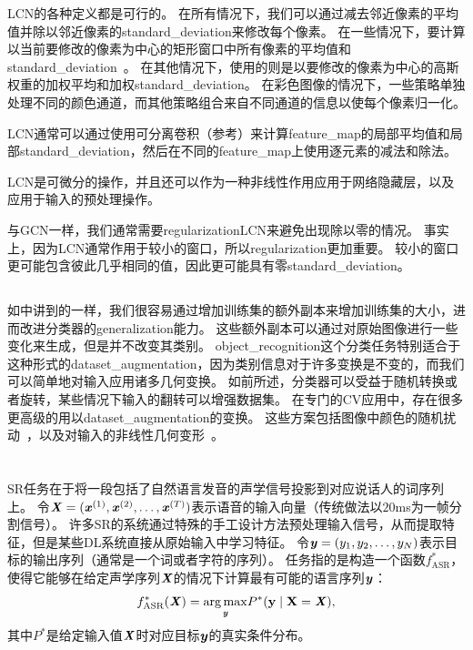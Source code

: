 \gls{LCN}的各种定义都是可行的。
在所有情况下，我们可以通过减去邻近像素的平均值并除以邻近像素的\gls{standard_deviation}来修改每个像素。
在一些情况下，要计算以当前要修改的像素为中心的矩形窗口中所有像素的平均值和\gls{standard_deviation}~\citep{Pinto08}。
在其他情况下，使用的则是以要修改的像素为中心的高斯权重的加权平均和加权\gls{standard_deviation}。
在彩色图像的情况下，一些策略单独处理不同的颜色通道，而其他策略组合来自不同通道的信息以使每个像素归一化\citep{sermanet-icpr-12}。

\gls{LCN}通常可以通过使用可分离卷积（参考）来计算\gls{feature_map}的局部平均值和局部\gls{standard_deviation}，然后在不同的\gls{feature_map}上使用逐元素的减法和除法。

\gls{LCN}是可微分的操作，并且还可以作为一种非线性作用应用于网络隐藏层，以及应用于输入的预处理操作。

与\gls{GCN}一样，我们通常需要\gls{regularization}\gls{LCN}来避免出现除以零的情况。
事实上，因为\gls{LCN}通常作用于较小的窗口，所以\gls{regularization}更加重要。
较小的窗口更可能包含彼此几乎相同的值，因此更可能具有零\gls{standard_deviation}。


\subsection{}
\label{sec:dataset_augmentation_chap12}
如中讲到的一样，我们很容易通过增加训练集的额外副本来增加训练集的大小，进而改进分类器的\gls{generalization}能力。
这些额外副本可以通过对原始图像进行一些变化来生成，但是并不改变其类别。
\gls{object_recognition}这个分类任务特别适合于这种形式的\gls{dataset_augmentation}，因为类别信息对于许多变换是不变的，而我们可以简单地对输入应用诸多几何变换。
如前所述，分类器可以受益于随机转换或者旋转，某些情况下输入的翻转可以增强数据集。
在专门的\gls{CV}应用中，存在很多更高级的用以\gls{dataset_augmentation}的变换。
这些方案包括图像中颜色的随机扰动~\citep{Krizhevsky-2012}，以及对输入的非线性几何变形~\citep{LeCun98-small}。




\section{}
\label{sec:speech_recognition}

\gls{SR}任务在于将一段包括了自然语言发音的声学信号投影到对应说话人的词序列上。
令$\boldsymbol{\mathit{X}}=(\boldsymbol{\mathit{x}}^{(1)},\boldsymbol{\mathit{x}}^{(2)},\ldots,\boldsymbol{\mathit{x}}^{(T)})$表示语音的输入向量（传统做法以$20$ms为一帧分割信号）。
许多\gls{SR}的系统通过特殊的手工设计方法预处理输入信号，从而提取特征，但是某些\gls{DL}系统\citep{jaitly2011learning}直接从原始输入中学习特征。
令$\boldsymbol{\mathit{y}}=(y_{1},y_{2},\ldots,y_{N})$表示目标的输出序列（通常是一个词或者字符的序列）。
任务指的是构造一个函数$f^*_{\text{ASR}}$，使得它能够在给定声学序列$\boldsymbol{\mathit{X}}$的情况下计算最有可能的语言序列$\boldsymbol{\mathit{y}}$：
\begin{align}
\label{eqn:124}
f^*_{\text{ASR}}(\boldsymbol{\mathit{X}}) =  \underset{\boldsymbol{\mathit{y}}}{\arg\max}  P^*(\mathbf{y} \mid \boldsymbol{\mathrm{X}} = \boldsymbol{\mathit{X}}),
\end{align}
其中$P^*$是给定输入值$\boldsymbol{\mathit{X}}$时对应目标$\boldsymbol{\mathit{y}}$的真实条件分布。

